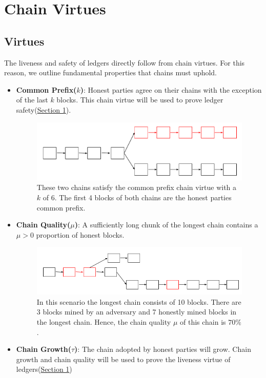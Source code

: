 \section{Chain Virtues}
\subsection{Virtues}
The liveness and safety of ledgers directly follow from chain virtues. For this reason, we outline fundamental properties that chains must uphold.
\begin{itemize}
    \item \textbf{Common Prefix($k$)}:
        Honest parties agree on their chains with the exception of the last $k$ blocks. This chain virtue will be used to prove ledger safety(\hyperref[sec:saftey]{Section 1}).
        \begin{figure}[h]
        \centering
        \includegraphics[width=\linewidth]{figures/commonprefix.pdf}
        \caption{These two chains satisfy the common prefix chain virtue with a $k$ of 6. The first 4 blocks of both chains are the honest parties common prefix.}
        \end{figure}
    \item \textbf{Chain Quality($\mu$)}: A sufficiently long chunk of the longest chain contains a $\mu > 0$ proportion of honest blocks.
    \begin{figure}[h]
    \centering
        \includegraphics[width=\linewidth]{figures/chainquality.png}
        \caption{In this scenario the longest chain consists of 10 blocks. There are 3 blocks mined by an adversary and 7 honestly mined blocks in the longest chain. Hence, the chain quality $\mu$ of this chain is $70\%$. }
    \end{figure}
    \item \textbf{Chain Growth($\tau$)}: The chain adopted by honest parties will grow. Chain growth and chain quality will be used to prove the liveness virtue of ledgers(\hyperref[sec:liveness]{Section 1})

\end{itemize}

